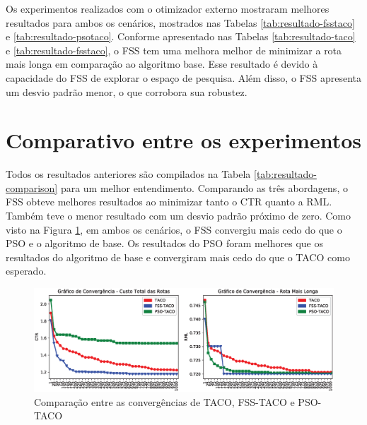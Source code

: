 Os experimentos realizados com o otimizador externo mostraram melhores resultados para ambos os cenários, mostrados nas Tabelas \ref{tab:resultado-fsstaco} e \ref{tab:resultado-psotaco}. Conforme apresentado nas Tabelas \ref{tab:resultado-taco} e \ref{tab:resultado-fsstaco}, o FSS tem uma melhora melhor de minimizar a rota mais longa em comparação ao algoritmo base. Esse resultado é devido à capacidade do FSS de explorar o espaço de pesquisa. Além disso, o FSS apresenta um desvio padrão menor, o que corrobora sua robustez.

\section{Comparativo entre os experimentos}
\label{sec-resultados-taco}

Todos os resultados anteriores são compilados na Tabela \ref{tab:resultado-comparison} para um melhor entendimento. Comparando as três abordagens, o FSS obteve melhores resultados ao minimizar tanto o CTR quanto a RML. Também teve o menor resultado com um desvio padrão próximo de zero. Como visto na Figura \ref{fig:resultados-convergencia}, em ambos os cenários, o FSS convergiu mais cedo do que o PSO e o algoritmo de base. Os resultados do PSO foram melhores que os resultados do algoritmo de base e convergiram mais cedo do que o TACO como esperado.

\begin{figure}[htb]
    \centering
    \caption{Comparação entre as convergências de TACO, FSS-TACO e PSO-TACO} \label{fig:resultados-convergencia}
    \includegraphics[width=\textwidth]{imagens/convergence-approaches.eps}
\end{figure}

